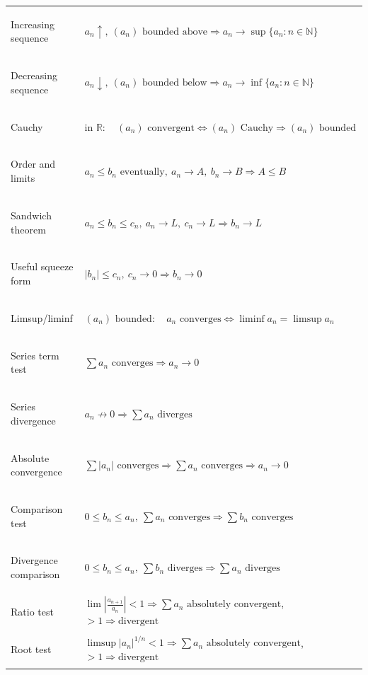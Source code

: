 {\begin{minipage}[t]{0.495\textwidth}
\begin{tabular}{
    @{}
    >{\bfseries\raggedright\arraybackslash}p{2.9cm}
    >{\raggedright\arraybackslash}p{10.5cm}
    @{}
}
Increasing sequence &
$a_n\uparrow,\ (a_n)\text{ bounded above}
\Rightarrow a_n\to\sup\{a_n:n\in\mathbb N\}$ \\

Decreasing sequence &
$a_n\downarrow,\ (a_n)\text{ bounded below}
\Rightarrow a_n\to\inf\{a_n:n\in\mathbb N\}$ \\

Cauchy &
$\text{in }\mathbb R:\quad
(a_n)\text{ convergent}
\Longleftrightarrow
(a_n)\text{ Cauchy}
\Rightarrow
(a_n)\text{ bounded}$ \\

Order and limits &
$a_n\le b_n\text{ eventually},\
a_n\to A,\ b_n\to B
\Rightarrow A\le B$ \\

Sandwich theorem &
$a_n\le b_n\le c_n,\ a_n\to L,\ c_n\to L
\Rightarrow b_n\to L$ \\

Useful squeeze form &
$|b_n|\le c_n,\ c_n\to0
\Rightarrow b_n\to0$ \\

Limsup/liminf &
$(a_n)\text{ bounded}:\quad
a_n\text{ converges}
\Longleftrightarrow
\liminf a_n=\limsup a_n$ \\


Series term test &
$\sum a_n\text{ converges}
\Rightarrow a_n\to0$ \\

Series divergence &
$a_n\not\to0
\Rightarrow \sum a_n\text{ diverges}$ \\

Absolute convergence &
$\sum |a_n|\text{ converges}
\Rightarrow
\sum a_n\text{ converges}
\Rightarrow
a_n\to0$ \\

Comparison test &
$0\le b_n\le a_n,\ \sum a_n\text{ converges}
\Rightarrow \sum b_n\text{ converges}$ \\

Divergence comparison &
$0\le b_n\le a_n,\ \sum b_n\text{ diverges}
\Rightarrow \sum a_n\text{ diverges}$ \\

Ratio test &
$\lim\left|\frac{a_{n+1}}{a_n}\right|<1
\Rightarrow \sum a_n\text{ absolutely convergent}$,
\quad
$>1\Rightarrow\text{divergent}$ \\

Root test &
$\limsup |a_n|^{1/n}<1
\Rightarrow \sum a_n\text{ absolutely convergent}$,
\quad
$>1\Rightarrow\text{divergent}$ \\


\end{tabular}
\end{minipage}}
